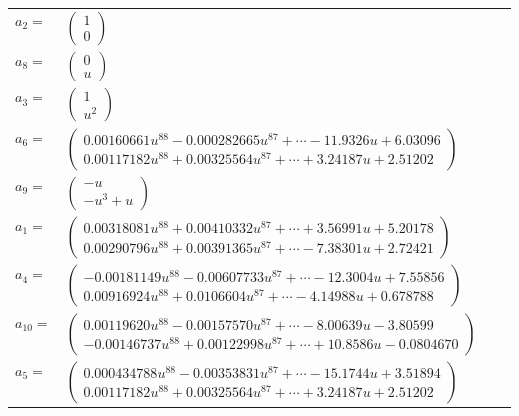 \documentclass[1p]{elsarticle_modified}
\theoremstyle{definition}
\begin{document}
\begin{tabular}{m{7pt} m{180pt} m{7pt} m{180pt} }
\flushright $a_{2}=$&$\begin{pmatrix}1\\0\end{pmatrix}$ \\
\flushright $a_{8}=$&$\begin{pmatrix}0\\u\end{pmatrix}$ \\
\flushright $a_{3}=$&$\begin{pmatrix}1\\u^2\end{pmatrix}$ \\
\flushright $a_{6}=$&$\begin{pmatrix}0.00160661 u^{88}-0.000282665 u^{87}+\cdots-11.9326 u+6.03096\\0.00117182 u^{88}+0.00325564 u^{87}+\cdots+3.24187 u+2.51202\end{pmatrix}$ \\
\flushright $a_{9}=$&$\begin{pmatrix}- u\\- u^3+u\end{pmatrix}$ \\
\flushright $a_{1}=$&$\begin{pmatrix}0.00318081 u^{88}+0.00410332 u^{87}+\cdots+3.56991 u+5.20178\\0.00290796 u^{88}+0.00391365 u^{87}+\cdots-7.38301 u+2.72421\end{pmatrix}$ \\
\flushright $a_{4}=$&$\begin{pmatrix}-0.00181149 u^{88}-0.00607733 u^{87}+\cdots-12.3004 u+7.55856\\0.00916924 u^{88}+0.0106604 u^{87}+\cdots-4.14988 u+0.678788\end{pmatrix}$ \\
\flushright $a_{10}=$&$\begin{pmatrix}0.00119620 u^{88}-0.00157570 u^{87}+\cdots-8.00639 u-3.80599\\-0.00146737 u^{88}+0.00122998 u^{87}+\cdots+10.8586 u-0.0804670\end{pmatrix}$ \\
\flushright $a_{5}=$&$\begin{pmatrix}0.000434788 u^{88}-0.00353831 u^{87}+\cdots-15.1744 u+3.51894\\0.00117182 u^{88}+0.00325564 u^{87}+\cdots+3.24187 u+2.51202\end{pmatrix}$ \\

\end{tabular}
\end{document}
